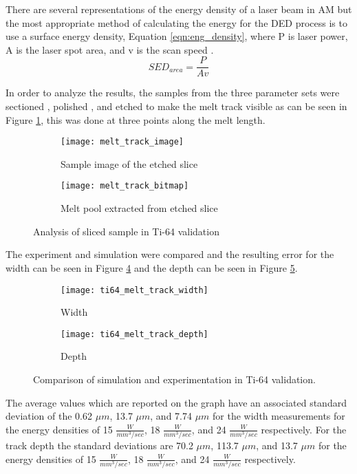 There are several representations of the energy density of a laser beam in \ac{AM} but the most appropriate method of calculating the energy for the \ac{DED} process is to use a surface energy density, Equation \ref{eqn:eng_density}, where P is laser power, A is the laser spot area, and v is the scan speed \cite{kurzynowskiEffectScanningSupport2019}.
\begin{equation}
	SED_{area} = \frac{P}{A v} \label{eqn:eng_density}
\end{equation}


In order to analyze the results, the samples from the three parameter sets were sectioned , polished , and etched  to make the melt track visible  as can be seen in Figure \ref{fig:melt_track_image}, this was done at three points along the melt length.  
\begin{figure}[!htb]
	\centering
		\begin{subfigure}{0.495\textwidth}
		\texttt{[image: melt\_track\_image]}
		\caption{Sample image of the etched slice}
		\label{fig:melt_track_image}
		\end{subfigure}
			\begin{subfigure}{0.495\textwidth}
			\texttt{[image: melt\_track\_bitmap]}
			\caption{Melt pool extracted from etched slice}
			\label{fig:melt_track_bitmap}
			\end{subfigure}
	\caption{Analysis of sliced sample in Ti-64 validation}
	\label{fig:melt_track}
\end{figure}
The experiment and simulation were compared and the resulting error for the width can be seen in Figure \ref{fig:ti64_melt_track_width} and the depth can be seen in Figure \ref{fig:ti64_melt_track_depth}.
\begin{figure}[!htb]\centering
	\begin{subfigure}[c]{0.45\textwidth}\centering
	\texttt{[image: ti64\_melt\_track\_width]}
	\caption{Width}
	\label{fig:ti64_melt_track_width}
	\end{subfigure}\hfill{}
		\begin{subfigure}[c]{0.45\textwidth}\centering
		\texttt{[image: ti64\_melt\_track\_depth]}
		\caption{Depth}
		\label{fig:ti64_melt_track_depth}
		\end{subfigure}
	\caption{Comparison of simulation and experimentation in Ti-64 validation.}
	\label{fig:ti64_melt_track}
\end{figure}
The average values which are reported on the graph have an associated standard deviation of the 0.62 $\mu m$, 13.7 $\mu m$, and 7.74 $\mu m$ for the width measurements for the energy densities of 15 $\frac{W}{mm^3/sec}$, 18 $\frac{W}{mm^3/sec}$, and 24 $\frac{W}{mm^3/sec}$ respectively.  For the track depth the standard deviations are 70.2 $\mu m$, 113.7 $\mu m$, and 13.7 $\mu m$ for the energy densities of 15 $\frac{W}{mm^3/sec}$, 18 $\frac{W}{mm^3/sec}$, and 24 $\frac{W}{mm^3/sec}$ respectively.

